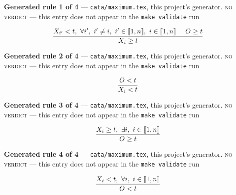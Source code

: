 \documentclass[10pt,a4paper]{article}
\newcommand{\rulebox}[1]{%
  \[\resizebox{\ifdim\width>\linewidth\linewidth\else\width\fi}{!}%
    {$\displaystyle #1$}\]}
\begin{document}
{\small\textbf{Generated rule 1 of 4} --- \texttt{cata/maximum.tex}, this project's generator. \textsc{no verdict} --- this entry does not appear in the \texttt{make validate} run\par}
\rulebox{\frac{X_{i'}<t,~\forall i',~i' \neq i,~i' \in \llbracket1,n\rrbracket,~i \in \llbracket1,n\rrbracket~~~~O_{} \geq t}{X_{i} \geq t}}

{\small\textbf{Generated rule 2 of 4} --- \texttt{cata/maximum.tex}, this project's generator. \textsc{no verdict} --- this entry does not appear in the \texttt{make validate} run\par}
\rulebox{\frac{O_{}<t}{X_{i}<t}}

{\small\textbf{Generated rule 3 of 4} --- \texttt{cata/maximum.tex}, this project's generator. \textsc{no verdict} --- this entry does not appear in the \texttt{make validate} run\par}
\rulebox{\frac{X_{i} \geq t,~\exists i,~i \in \llbracket1,n\rrbracket}{O_{} \geq t}}

{\small\textbf{Generated rule 4 of 4} --- \texttt{cata/maximum.tex}, this project's generator. \textsc{no verdict} --- this entry does not appear in the \texttt{make validate} run\par}
\rulebox{\frac{X_{i}<t,~\forall i,~i \in \llbracket1,n\rrbracket}{O_{}<t}}
\end{document}
